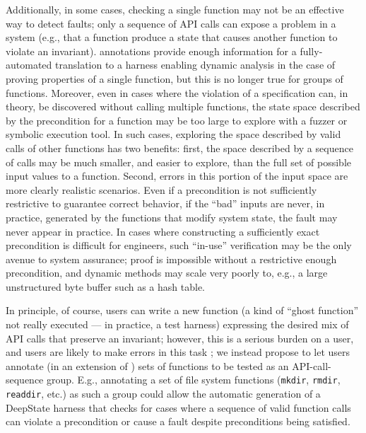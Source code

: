 Additionally, in some cases, checking a single function may not be an effective way to detect faults; only a sequence of API calls can expose a problem in a system (e.g., that a function produce a state that causes another function to violate an invariant).  \acsl annotations provide enough information for a fully-automated translation to a harness enabling dynamic analysis in the case of proving properties of a single function, but this is no longer true for groups of functions.  Moreover, even in cases where the violation of a specification can, in theory, be discovered without calling multiple functions, the state space described by the precondition for a function may be too large to explore with a fuzzer or symbolic execution tool.  In such cases, exploring the space described by valid calls of other functions has two benefits:  first, the space described by a sequence of calls may be much smaller, and easier to explore, than the full set of possible input values to a function.  Second, errors in this portion of the input space are more clearly realistic scenarios.  Even if a precondition is not sufficiently restrictive to guarantee correct behavior, if the ``bad'' inputs are never, in practice, generated by the functions that modify system state, the fault may never appear in practice.  In cases where constructing a sufficiently exact precondition is difficult for engineers, such ``in-use'' verification may be the only avenue to system assurance; proof is impossible without a restrictive enough precondition, and dynamic methods may scale very poorly to, e.g., a large unstructured byte buffer such as a hash table.

In principle, of course, users can write a new function (a kind of ``ghost function'' not really executed --- in practice, a test harness) expressing the desired mix of API calls that preserve an invariant; however, this is a serious burden on a user, and users are likely to make errors in this task \cite{CFV08,AMAI,scriptstospecs,groce2015verified,groce2018verified}; we instead propose to let users annotate (in an extension of \acsl) sets of functions to be tested as an API-call-sequence group.  E.g., annotating a set of file system functions ({\tt mkdir}, {\tt rmdir}, {\tt readdir}, etc.) as such a group could allow the automatic generation of a DeepState harness that checks for cases where a sequence of valid function calls can violate a precondition or cause a fault despite preconditions being satisfied.

